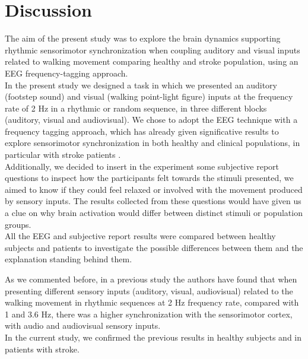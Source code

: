 \chapter{Discussion}
The aim of the present study was to explore the brain dynamics supporting rhythmic sensorimotor synchronization when coupling auditory and visual inputs related to walking movement comparing healthy and stroke population, using an EEG frequency-tagging approach. \\
In the present study we designed a task in which we presented an auditory (footstep sound) and visual (walking point-light figure) inputs at the frequency rate of 2 Hz in a rhythmic or random sequence, in three different blocks (auditory, visual and audiovisual). We chose to adopt the EEG technique with a frequency tagging approach, which has already given significative results to explore sensorimotor synchronization in both healthy \parencite{Cracco_2022} and clinical populations, in particular with stroke patients \parencite{Nozaradan_2017}. \\
Additionally, we decided to insert in the experiment some subjective report questions to inspect how the participants felt towards the stimuli presented, we aimed to know if they could feel relaxed or involved with the movement produced by sensory inputs. The results collected from these questions would have given us a clue on why brain activation would differ between distinct stimuli or population groups. \\
All the EEG and subjective report results were compared between healthy subjects and patients to investigate the possible differences between them and the explanation standing behind them.

As we commented before, in a previous study the authors have found that when presenting different sensory inputs (auditory, visual, audiovisual) related to the walking movement in rhythmic sequences at 2 Hz frequency rate, compared with 1 and 3.6 Hz, there was a higher synchronization with the sensorimotor cortex, with audio and audiovisual sensory inputs.\\
In the current study, we confirmed the previous results in healthy subjects and in patients with stroke. 

